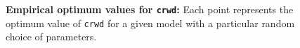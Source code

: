 \documentclass[12pt]{article}
\makeatletter
\newcommand{\py}[1]{\lstinline[language=Python, showstringspaces=False]@#1@}
\makeatother
\begin{document}
\begin{figure}
\centering
{}
\caption{\textbf{Empirical optimum values for \py{crwd}:} Each point represents the optimum value of \py{crwd} for a given model with a particular random choice of parameters.\label{fig:best_crwd}}
\end{figure}
\end{document}
